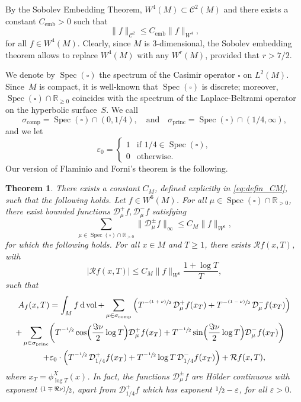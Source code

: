 \documentclass[JEP,XML,SOM,NoEqCountersInSection,Unicode,published]{cedram}
\newcommand{\psfrac}[2]{\sfrac{(#1)}{#2}}
\newcommand \R{\mathbb{R}}
\newcommand*{\diff}{\mathop{}\!\mathrm{d}}
\newcommand{\Dp}[1]{\mathcal{D}_\mu^{+} #1}
\newcommand{\Dm}[1]{\mathcal{D}_\mu^{-} #1}
\newcommand{\Dpm}[1]{\mathcal{D}_\mu^{\pm} #1}
\newcommand{\aver}[1]{A_{#1}(x,T)}
\DeclareMathOperator{\vol}{vol}
\DeclareMathOperator{\emb}{emb}
\DeclareMathOperator{\Spec}{Spec}
\DeclareMathOperator{\comp}{comp}
\DeclareMathOperator{\princ}{princ}
\newtheorem{theorem}{Theorem}
\theoremstyle{definition}
\begin{document}
By the Sobolev Embedding Theorem, $W^4(M) \subset \mathscr{C}^2(M)$ and there exists a constant $C_{\emb}>0$ such that
\[
\|f\|_{\mathscr{C}^2} \leq C_{\emb} \|f\|_{W^4},
\]
for all $f \in W^4(M)$. Clearly, since $M$ is 3-dimensional, the Sobolev embedding theorem allows to replace $W^4(M)$ with any $W^r(M)$, provided that $r > 7/2$.

We denote by $\Spec(\square)$ the spectrum of the Casimir operator $\square$ on $L^2(M)$.
Since~$M$ is compact, it is well-known that $\Spec(\square)$ is discrete; moreover, $\Spec(\square) \cap \R_{\geq 0}$ coincides with the spectrum of the Laplace-Beltrami operator on the hyperbolic surface~$S$. We call
\[
\sigma_{\comp} = \Spec(\square) \cap (0,1/4), \quad\text{and}\quad \sigma_{\princ} = \Spec(\square) \cap (1/4, \infty),
\]
and we let
\[
\varepsilon_0 =
\begin{cases}
1 & \text{if } 1/4 \in \Spec(\square),\\
0 & \text{otherwise}.
\end{cases}
\]
Our version of Flaminio and Forni's theorem is the following.
\begin{theorem}\label{thm:main_FF}
There exists a constant $C_M$, defined explicitly in \eqref{eq:defin_CM}, such that the following holds. Let $f \in W^6(M)$. For all $\mu \in \Spec(\square) \cap \R_{>0}$, there exist bounded functions $\Dp{f}, \Dm{f}$ satisfying
\[
\sum_{\mu \in \Spec(\square) \cap \R_{>0}} \|\Dpm{f}\|_{\infty} \leq C_M \|f \|_{W^6},
\]
for which the following holds. For all $x \in M$ and $T \geq 1$, there exists $\mathcal{R}f(x,T)$, with
\[
|\mathcal{R}f(x,T)|\leq C_M \|f \|_{W^6} \frac{1+ \log T}{T},
\]
such that
\begin{multline*}
\aver{f} = \int_M f \diff \vol + \sum_{\mu \in \sigma_{\comp}} \left(T^{-\psfrac{1+\nu}{2}} \, \Dp{f(x_T) } + T^{-\psfrac{1-\nu}{2}} \, \Dm{ f(x_T)} \right)\\
\shoveright{+ \sum_{\mu \in \sigma_{\princ}}\biggl(T^{-\sfrac{1}{2}} \cos\Bigl(\frac{\Im\nu}{2} \log T \Bigr) \Dp{ f(x_T)} + T^{-\sfrac{1}{2}} \sin\Bigl(\frac{\Im\nu}{2} \log T \Bigr) \Dm{ f(x_T)} \biggr)} \\
+ \varepsilon_0 \cdot \left(T^{-\sfrac{1}{2}} \, \mathcal{D}^{+}_{1/4} f(x_T) + T^{-\sfrac{1}{2}} \log T \, \mathcal{D}^{-}_{1/4} f(x_T) \right) + \mathcal{R}f(x,T),
\end{multline*}
where $x_T= \phi^X_{\log T}(x)$. In fact, the functions $\Dpm{f}$ are \emph{Hölder continuous} with exponent $\psfrac{1 \mp \Re\nu}{2}$, apart from $\mathcal{D}^{+}_{1/4}f$ which has exponent $\sfrac{1}{2}- \varepsilon$, for all $\varepsilon >0$.
\end{theorem}
\end{document}
